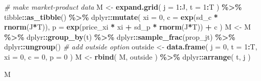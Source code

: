 \documentclass[
]{book}
\newenvironment{Shaded}{\begin{snugshade}}{\end{snugshade}}
\newcommand{\AttributeTok}[1]{\textcolor[rgb]{0.13,0.29,0.53}{#1}}
\newcommand{\CommentTok}[1]{\textcolor[rgb]{0.56,0.35,0.01}{\textit{#1}}}
\newcommand{\DecValTok}[1]{\textcolor[rgb]{0.00,0.00,0.81}{#1}}
\newcommand{\FunctionTok}[1]{\textcolor[rgb]{0.13,0.29,0.53}{\textbf{#1}}}
\newcommand{\NormalTok}[1]{#1}
\newcommand{\OtherTok}[1]{\textcolor[rgb]{0.56,0.35,0.01}{#1}}
\newcommand{\SpecialCharTok}[1]{\textcolor[rgb]{0.81,0.36,0.00}{\textbf{#1}}}
\begin{document}
\begin{Shaded}
\begin{Highlighting}[]
\CommentTok{\# make market{-}product data}
\NormalTok{M }\OtherTok{\textless{}{-}} 
  \FunctionTok{expand.grid}\NormalTok{(}
    \AttributeTok{j =} \DecValTok{1}\SpecialCharTok{:}\NormalTok{J, }
    \AttributeTok{t =} \DecValTok{1}\SpecialCharTok{:}\NormalTok{T}
\NormalTok{    ) }\SpecialCharTok{\%\textgreater{}\%}
\NormalTok{  tibble}\SpecialCharTok{::}\FunctionTok{as\_tibble}\NormalTok{() }\SpecialCharTok{\%\textgreater{}\%}
\NormalTok{  dplyr}\SpecialCharTok{::}\FunctionTok{mutate}\NormalTok{(}
    \AttributeTok{xi =} \DecValTok{0}\NormalTok{,}
    \AttributeTok{c =} \FunctionTok{exp}\NormalTok{(sd\_c }\SpecialCharTok{*} \FunctionTok{rnorm}\NormalTok{(J}\SpecialCharTok{*}\NormalTok{T)),}
    \AttributeTok{p =} \FunctionTok{exp}\NormalTok{(price\_xi }\SpecialCharTok{*}\NormalTok{ xi }\SpecialCharTok{+}\NormalTok{ sd\_p }\SpecialCharTok{*} \FunctionTok{rnorm}\NormalTok{(J}\SpecialCharTok{*}\NormalTok{T)) }\SpecialCharTok{+}\NormalTok{ c}
\NormalTok{  ) }
\NormalTok{M }\OtherTok{\textless{}{-}} 
\NormalTok{  M }\SpecialCharTok{\%\textgreater{}\%}
\NormalTok{  dplyr}\SpecialCharTok{::}\FunctionTok{group\_by}\NormalTok{(t) }\SpecialCharTok{\%\textgreater{}\%}
\NormalTok{  dplyr}\SpecialCharTok{::}\FunctionTok{sample\_frac}\NormalTok{(prop\_jt) }\SpecialCharTok{\%\textgreater{}\%}
\NormalTok{  dplyr}\SpecialCharTok{::}\FunctionTok{ungroup}\NormalTok{()}
\CommentTok{\# add outside option}
\NormalTok{outside }\OtherTok{\textless{}{-}} 
  \FunctionTok{data.frame}\NormalTok{(}
    \AttributeTok{j =} \DecValTok{0}\NormalTok{, }
    \AttributeTok{t =} \DecValTok{1}\SpecialCharTok{:}\NormalTok{T, }
    \AttributeTok{xi =} \DecValTok{0}\NormalTok{, }
    \AttributeTok{c =} \DecValTok{0}\NormalTok{, }
    \AttributeTok{p =} \DecValTok{0}
\NormalTok{    )}
\NormalTok{M }\OtherTok{\textless{}{-}} 
  \FunctionTok{rbind}\NormalTok{(}
\NormalTok{    M,}
\NormalTok{    outside}
\NormalTok{    ) }\SpecialCharTok{\%\textgreater{}\%}
\NormalTok{  dplyr}\SpecialCharTok{::}\FunctionTok{arrange}\NormalTok{(}
\NormalTok{    t, }
\NormalTok{    j}
\NormalTok{    )}
\end{Highlighting}
\end{Shaded}

\begin{Shaded}
\begin{Highlighting}[]
\NormalTok{M}
\end{Highlighting}
\end{Shaded}
\end{document}
